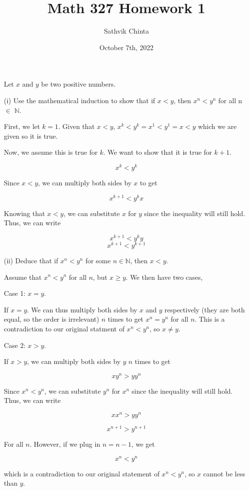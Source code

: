 \documentclass[addpoints]{exam}
\title{Math 327 Homework 1}
\author{Sathvik Chinta}
\date{October 7th, 2022}
\begin{document}
\maketitle

\begin{questions}
\question Let $x$ and $y$ be two positive numbers. 

(i) Use the mathematical induction to show that if $x < y$, then $x^n < y^n$ for all
n $\in$ $\mathbb{N}$. 

First, we let $k = 1$. Given that $x < y$, $x^{k} < y^{k} = x^{1} < y^{1} = x < y$ which we are given so it is true. 

Now, we assume this is true for $k$. We want to show that it is true for $k+1$.

\[x^{k} < y^{k}\]

Since $x < y$, we can multiply both sides by $x$ to get

\[x^{k+1} < y^{k}x\]

Knowing that $x < y$, we can substitute $x$ for $y$ since the inequality will still hold. Thus, we can write

\[x^{k+1} < y^{k}y\]
\[x^{k+1} < y^{k+1}\]

(ii) Deduce that if $x^n < y^n$ for some $n \in \mathbb{N}$, then $x < y$.

Assume that $x^{n} < y^{n}$ for all $n$, but $x \geq y$. We then have two cases, 

Case 1: $x = y$.

If $x = y$. We can thus multiply both sides by $x$ and $y$ respectively (they are both equal, so 
the order is irrelevant) $n$ times to get $x^{n} = y^{n}$ for all $n$. This is a contradiction to our original statment of 
$x^{n} < y^{n}$, so $x \neq y$.

Case 2: $x > y$.

If $x > y$, we can multiply both sides by $y$ $n$ times to get 

\[xy^{n} > yy^{n}\]

Since $x^{n} < y^{n}$, we can substitute $y^{n}$ for $x^{n}$ since the inequality will still hold. Thus, we can write

\[xx^{n} > yy^{n}\]

\[x^{n+1} > y^{n+1}\]

For all $n$. However, if we plug in $n = n - 1$, we get 

\[x^{n} < y^{n}\]

which is a contradiction to our original statement of $x^{n} < y^{n}$, so $x$ cannot be less than $y$. 


\end{questions}
\end{document}
